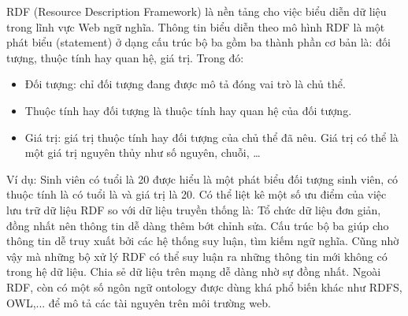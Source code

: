 RDF (Resource Description Framework) là nền tảng cho việc biểu diễn dữ liệu trong lĩnh vực Web ngữ nghĩa. Thông tin biểu diễn theo mô hình RDF là một phát biểu (statement) ở dạng cấu trúc bộ ba gồm ba thành phần cơ bản là: đối tượng, thuộc tính hay quan hệ, giá trị. Trong đó:
\begin{itemize}
	\item Đối tượng: chỉ đối tượng đang được mô tả đóng vai trò là chủ thể.
	\item Thuộc tính hay đối tượng là thuộc tính hay quan hệ của đối tượng.
	\item Giá trị: giá trị thuộc tính hay đối tượng của chủ thể đã nêu. Giá trị có thể là một giá trị nguyên thủy như số nguyên, chuỗi, …
\end{itemize}
Ví dụ: Sinh viên có tuổi là 20 được hiểu là một phát biểu đối tượng sinh viên, có thuộc tính là có tuổi là và giá trị là 20.
Có thể liệt kê một số ưu điểm của việc lưu trữ dữ liệu RDF so với dữ liệu truyền thống là: 
Tổ chức dữ liệu đơn giản, đồng nhất nên thông tin dễ dàng thêm bớt chỉnh sửa.
Cấu trúc bộ ba giúp cho thông tin dễ truy xuất bởi các hệ thống suy luận, tìm kiếm ngữ nghĩa. Cũng nhờ vậy mà những bộ xử lý RDF có thể suy luận ra những thông tin mới không có trong hệ dữ liệu.
Chia sẻ dữ liệu trên mạng dễ dàng nhờ sự đồng nhất. Ngoài RDF, còn có một số ngôn ngữ ontology được dùng khá phổ biến khác như RDFS, OWL,... để mô tả các tài nguyên trên môi trường web.



